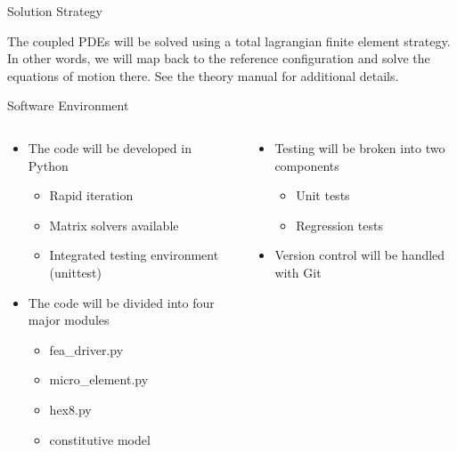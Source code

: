 \documentclass[11pt]{beamer}
\begin{document}
\begin{frame}{Solution Strategy}

The coupled PDEs will be solved using a total lagrangian finite element strategy. In other words, we will map back to the reference configuration and solve the equations of motion there. See the theory manual for additional details.

\end{frame}

\begin{frame}{Software Environment}

\begin{columns}
\begin{column}{0.5\textwidth}
\begin{itemize}
\item {The code will be developed in Python
\begin{itemize}
\item Rapid iteration
\item Matrix solvers available
\item Integrated testing environment (unittest)
\end{itemize}
}
\item{The code will be divided into four major modules
\begin{itemize}
\item fea\_driver.py
\item micro\_element.py
\item hex8.py
\item constitutive model
\end{itemize}
}
\end{itemize}
\end{column}
\begin{column}{0.5\textwidth}
\begin{itemize}
\item{
Testing will be broken into two components
\begin{itemize}
\item Unit tests
\item Regression tests
\end{itemize}
}
\item{
Version control will be handled with Git
}
\end{itemize}
\end{column}
\end{columns}

\end{frame}
\end{document}
